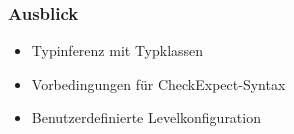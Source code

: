 \begin{frame}
	\frametitle{Ausblick}
	\begin{itemize}
		\item{Typinferenz mit Typklassen}
		\item{Vorbedingungen für CheckExpect-Syntax}
		\item{Benutzerdefinierte Levelkonfiguration}
	\end{itemize}
\end{frame}